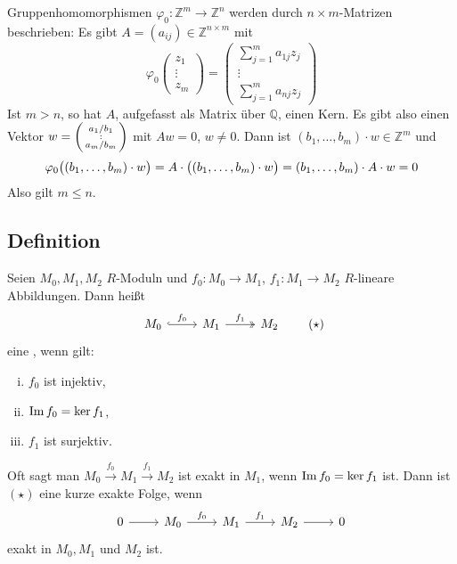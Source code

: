 Gruppenhomomorphismen $\varphi_0 : \mathds{Z}^m \to \mathds{Z}^n$ werden durch $n \times m$-Matrizen beschrieben: Es gibt $A= (a_{ij}) \in \mathds{Z}^{n \times m}$ mit
\[
	\varphi_0 \begin{pmatrix}
		z_1 \\ \vdots \\ z_m
	\end{pmatrix} = \begin{pmatrix}
		\sum_{j=1}^{m} a_{1j} z_j \\
		\vdots \\
		\sum_{j=1}^{m} a_{nj} z_j
	\end{pmatrix}
\]
Ist $m >n$, so hat $A$, aufgefasst als Matrix über $\mathds{Q}$, einen Kern. Es gibt also einen Vektor $w = \begin{psmallmatrix}a_1/b_1 \\ : \\ a_m/b_m\end{psmallmatrix}$
mit $A w = 0$, $w \not=0$. Dann ist $(b_1, \ldots , b_m) \cdot w \in \mathds{Z}^m$ und 
\[
	\varphi_0 \enbrace[\big]{(b_1, \ldots , b_m)\cdot w} = A \cdot \enbrace[\big]{(b_1, \ldots , b_m) \cdot w} = (b_1, \ldots , b_m) \cdot A \cdot w = 0 
\]
Also gilt $m \le n$. \bewende

\subsection[Definition: Kurze exakte Sequenz]{Definition} %
\label{sub:43}
Seien $M_0, M_1, M_2$ $R$-Moduln und $f_0 : M_0 \to M_1$, $f_1 : M_1 \to M_2$ $R$-lineare Abbildungen. Dann heißt 
\[
	\begin{tikzcd}
		M_0 \rar["f_0", hook] & M_1 \rar["f_1", two heads]& M_2 
	\end{tikzcd} \tag*{$(\star)$}
\]
eine , wenn gilt:
\begin{multicols}{3}
	\begin{enumerate}[(i)]
		\item $f_0$ ist injektiv,
		\item $\im f_0 = \ker f_1$,
		\item $f_1$ ist surjektiv.
	\end{enumerate}
\end{multicols}
Oft sagt man $M_0 \xrightarrow{f_0} M_1 \xrightarrow{f_1} M_2$ ist exakt in $M_1$, wenn $\im f_0 = \ker f_1$ ist. Dann ist $(\star)$ eine kurze exakte Folge, wenn
\[
	\begin{tikzcd}
		0 \rar & M_0 \rar["f_0"] & M_1 \rar["f_1"]& M_2 \rar & 0
	\end{tikzcd}
\]
exakt in $M_0, M_1$ und $M_2$ ist.

